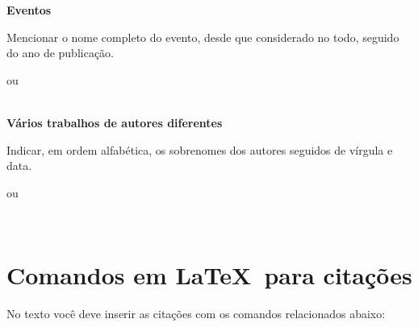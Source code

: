 \textbf{Eventos}

Mencionar o nome completo do evento, desde que considerado no todo, seguido do ano de publicação.\\

\cite{iniciacao1996}

ou

\\

\textbf{Vários trabalhos de autores diferentes}

Indicar, em ordem alfabética, os sobrenomes dos autores seguidos de vírgula e data.\\

\cite{Farias2001,ROMANO1996,SEKEFF2002} 
	
ou

 \\


\section{Comandos em \LaTeX\ para citações}


No texto você deve inserir as citações com os comandos relacionados abaixo:

